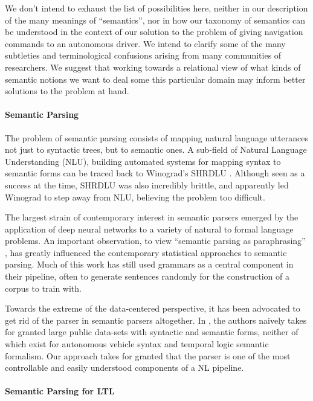 \documentclass{article}
\begin{document}
We don't intend to exhaust the list of possibilities here, neither in our
description of the many meanings of ``semantics'', nor in how our taxonomy of
semantics can be understood in the context of our solution to the problem of
giving navigation commands to an autonomous driver. We intend to clarify some of
the many subtleties and terminological confusions arising from many
communities of researchers. We suggest that working towards a relational view of
what kinds of semantic notions we want to deal some this particular domain may
inform better solutions to the problem at hand.

\paragraph{Semantic Parsing}

The problem of semantic parsing consists of mapping natural language utterances
not just to syntactic trees, but to semantic ones. A sub-field of Natural
Language Understanding (NLU), building automated systems for mapping syntax to
semantic forms can be traced back to Winograd's SHRDLU
\cite{winograd1971procedures}. Although seen as a success at the time, SHRDLU
was also incredibly brittle, and apparently led Winograd to step away from NLU,
believing the problem too difficult.

The largest strain of contemporary interest in semantic parsers emerged by the
application of deep neural networks to a variety of natural to formal language
problems. An important observation, to view ``semantic parsing as paraphrasing''
\cite{berant-liang-2014-semantic}, has greatly influenced the contemporary
statistical approaches to semantic parsing. Much of this work has still used
grammars as a central component in their pipeline, often to generate sentences
randomly for the construction of a corpus to train with.

Towards the extreme of the data-centered perspective, it has been advocated to
get rid of the parser in semantic parsers altogether. In \cite{dontParse}, the
authors naively takes for granted large public data-sets with syntactic and
semantic forms, neither of which exist for autonomous vehicle syntax and
temporal logic semantic formalism. Our approach takes for granted that the
parser is one of the most controllable and easily understood components of a NL
pipeline.

\paragraph{Semantic Parsing for LTL}
\end{document}

